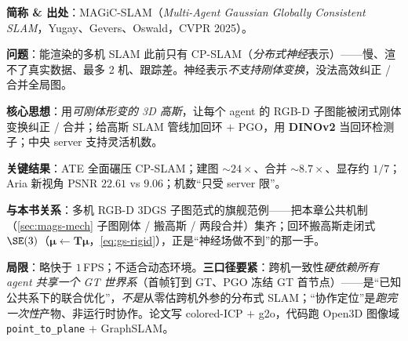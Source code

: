 \begin{paper}
\textbf{简称 \& 出处}：MAGiC-SLAM（\emph{Multi-Agent Gaussian Globally Consistent SLAM}，Yugay、Gevers、Oswald，CVPR 2025）\cite{yugay2025magicslam}。

\textbf{问题}：能渲染的多机 SLAM 此前只有 CP-SLAM（\emph{分布式神经}表示）——慢、渲不了真实数据、最多 2 机、跟踪差。神经表示\emph{不支持刚体变换}，没法高效纠正 / 合并全局图。

\textbf{核心思想}：用\emph{可刚体形变的 3D 高斯}，让每个 agent 的 RGB-D 子图能被闭式刚体变换纠正 / 合并；给高斯 SLAM 管线加回环 $+$ PGO，用 \textbf{DINOv2} 当回环检测子；中央 server 支持灵活机数。

\textbf{关键结果}：ATE 全面碾压 CP-SLAM；建图 $\sim\!24\times$、合并 $\sim\!8.7\times$、显存约 $1/7$；Aria 新视角 PSNR $22.61$ vs $9.06$；机数“只受 server 限”。

\textbf{与本书关系}：多机 RGB-D 3DGS 子图范式的旗舰范例——把本章公共机制（\cref{sec:mags-mech} 子图刚体 / 搬高斯 / 两段合并）集齐；回环搬高斯走闭式 $\SE(3)$（$\boldsymbol\mu\!\leftarrow\!\mathbf T\boldsymbol\mu$，\cref{eq:gs-rigid}），正是“神经场做不到”的那一手。

\textbf{局限}：略快于 $1$\,FPS；不适合动态环境。\textbf{三口径要紧}：跨机一致性\emph{硬依赖所有 agent 共享一个 GT 世界系}（首帧钉到 GT、PGO 冻结 GT 首节点）——是“已知公共系下的联合优化”，\emph{不是}从零估跨机外参的分布式 SLAM；“协作定位”是\emph{跑完一次性}产物、非运行时协作。论文写 colored-ICP $+$ g2o，代码跑 Open3D 图像域 \texttt{point\_to\_plane} $+$ GraphSLAM。
\end{paper}

